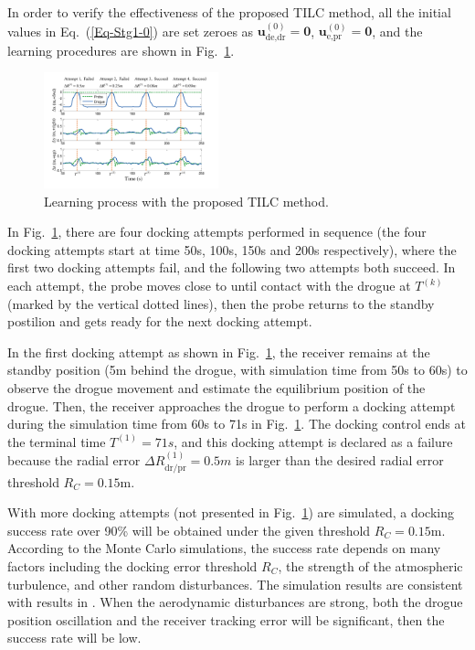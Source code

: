 In order to verify the effectiveness of the proposed TILC method,
all the initial values in Eq.~(\ref{Eq-Stg1-0}) are set zeroes as
$\mathbf{u}_{\text{de,dr}}^{\left(0\right)}=\mathbf{0}$, $\mathbf{u}_{\text{e,pr}}^{\left(0\right)}=\mathbf{0}$,
and the learning procedures are shown in Fig.~\ref{Fig_LearnProc}.

\begin{figure}[tbh]
	\centering \includegraphics[width=0.45\textwidth]{Figures/Figs_Ch9/LearningProc}
	\caption{Learning process with the proposed TILC method.}
	\label{Fig_LearnProc} 
\end{figure}

In Fig.~\ref{Fig_LearnProc}, there are four docking attempts performed
in sequence (the four docking attempts start at time 50s, 100s, 150s
and 200s respectively), where the first two docking attempts fail,
and the following two attempts both succeed. In each attempt, the
probe moves close to until contact with the drogue at $T^{\left(k\right)}$
(marked by the vertical dotted lines), then the probe returns to the
standby postilion and gets ready for the next docking attempt. 

In the first docking attempt as shown in Fig.~\ref{Fig_LearnProc},
the receiver remains at the standby position (5m behind the drogue,
with simulation time from 50s to 60s) to observe the drogue movement
and estimate the equilibrium position of the drogue. Then, the receiver
approaches the drogue to perform a docking attempt during the simulation
time from 60s to 71s in Fig.~\ref{Fig_LearnProc}. The docking control
ends at the terminal time $T^{\left(1\right)}=71s$, and this docking
attempt is declared as a failure because the radial error $\Delta R_{\text{dr/pr}}^{\left(1\right)}=0.5m$
is larger than the desired radial error threshold $R_{C}=0.15\text{m}$.

With more docking attempts (not presented in Fig.\ \ref{Fig_LearnProc})
are simulated, a docking success rate over 90\% will be obtained under
the given threshold $R_{C}=0.15\text{m}$. According to the Monte
Carlo simulations, the success rate depends on many factors including
the docking error threshold $R_{C}$, the strength of the atmospheric
turbulence, and other random disturbances. The simulation results
are consistent with results in \cite{Dibley-2007-2}\cite{Bhandari-2013-8}.
When the aerodynamic disturbances are strong, both the drogue position
oscillation and the receiver tracking error will be significant, then
the success rate will be low.


